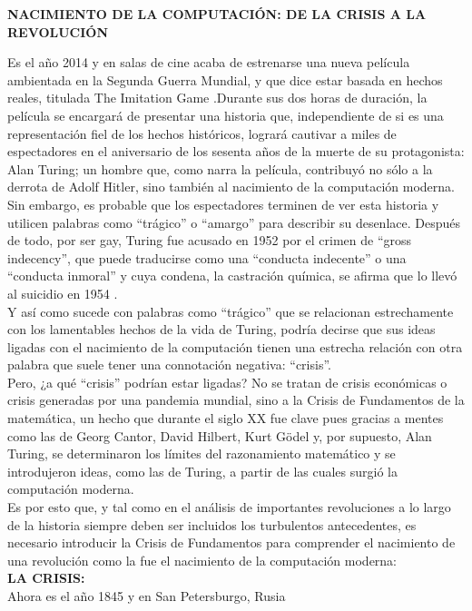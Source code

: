\documentclass[a4paper,11pt]{article}
\begin{document}
\newpage
\centerline{{\large\bfseries NACIMIENTO DE LA COMPUTACIÓN: DE LA CRISIS A LA REVOLUCIÓN}}
Es el año 2014 y en salas de cine acaba de estrenarse una nueva película ambientada en la Segunda Guerra Mundial, y que dice estar basada en hechos reales, titulada The Imitation Game \cite{imdb_2014}.Durante sus dos horas de duración, la película se encargará de presentar una historia que, independiente de si es una representación fiel de los hechos históricos, logrará cautivar a miles de espectadores en el aniversario de los sesenta años de la muerte de su protagonista: Alan Turing; un hombre que, como narra la película, contribuyó no sólo a la derrota de Adolf Hitler, sino también al nacimiento de la computación moderna.\\
Sin embargo, es probable que los espectadores terminen de ver esta historia y utilicen palabras como “trágico” o “amargo” para describir su desenlace. Después de todo, por ser gay, Turing fue acusado en 1952 por el crimen de “gross indecency”, que puede traducirse como una “conducta indecente” o una “conducta inmoral” y cuya condena, la castración química, se afirma que lo llevó al suicidio en 1954 \cite{grimstad_2020}.\\
Y así como sucede con palabras como “trágico” que se relacionan estrechamente con los lamentables hechos de la vida de Turing, podría decirse que sus ideas ligadas con el nacimiento de la computación tienen una estrecha relación con otra palabra que suele tener una connotación negativa: “crisis”.\\
Pero, ¿a qué “crisis” podrían estar ligadas? No se tratan de crisis económicas o crisis generadas por una pandemia mundial, sino a la Crisis de Fundamentos de la matemática, un hecho que durante el siglo XX \cite{chaitin2003ordenadores} fue clave pues gracias a mentes como las de Georg Cantor, David Hilbert, Kurt Gödel y, por supuesto, Alan Turing, se determinaron los límites del razonamiento matemático y se introdujeron ideas, como las de Turing, a partir de las cuales surgió la computación moderna.\\
Es por esto que, y tal como en el análisis de importantes revoluciones a lo largo de la historia siempre deben ser incluidos los turbulentos antecedentes, es necesario introducir la Crisis de Fundamentos para comprender el nacimiento de una revolución como la fue el nacimiento de la computación moderna: \\ 
{\large\bfseries LA CRISIS:} \\
Ahora es el año 1845 y en San Petersburgo, Rusia \cite{dusautoy_2018}
\end{document}
